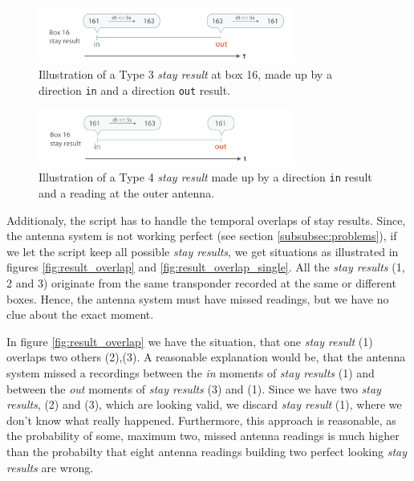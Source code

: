 \begin{figure}[htpb]
\begin{center}
  \includegraphics[width=0.75\textwidth]{assets/pdf/stay_result_type_3_schema.pdf}
  \caption[Illustration of a Type 3 \textit{stay result}]{Illustration of a Type 3 \textit{stay result} at box 16,  made up by a direction \lstinline|in| and a direction \lstinline|out| result.}
  \label{fig:type_3_stay_result}
\end{center}
\end{figure}

\begin{figure}[htpb]
\begin{center}
  \includegraphics[width=0.75\textwidth]{assets/pdf/stay_result_type_4_schema.pdf}
  \caption{Illustration of a Type 4 \textit{stay result} made up by a direction \lstinline|in| result and a reading at the outer antenna.}
  \label{fig:type_4_stay_result}
\end{center}
\end{figure}

Additionaly, the script has to handle the temporal overlaps of stay results. Since, the antenna system is not working perfect (see section \ref{subsubsec:problems}), if we let the script keep all possible \textit{stay results}, we get situations as illustrated in figures \ref{fig:result_overlap} and \ref{fig:result_overlap_single}. All the \textit{stay results} (1, 2 and 3) originate from the same transponder recorded at the same or different boxes. Hence, the antenna system must have missed readings, but we have no clue about the exact moment.  

In figure \ref{fig:result_overlap} we have the situation, that one \textit{stay result} (1) overlaps two others (2),(3). A reasonable explanation would be, that the antenna system missed a recordings between the \textit{in} moments of \textit{stay results} (1) and between the \textit{out} moments of \textit{stay results} (3) and (1). Since we have two \textit{stay results}, (2) and (3), which are looking valid, we discard \textit{stay result} (1), where we don't know what really happened. Furthermore, this approach is reasonable, as the probability of some, maximum two, missed antenna readings is much higher than the probabilty that eight antenna readings building two perfect looking \textit{stay results} are wrong.
 
